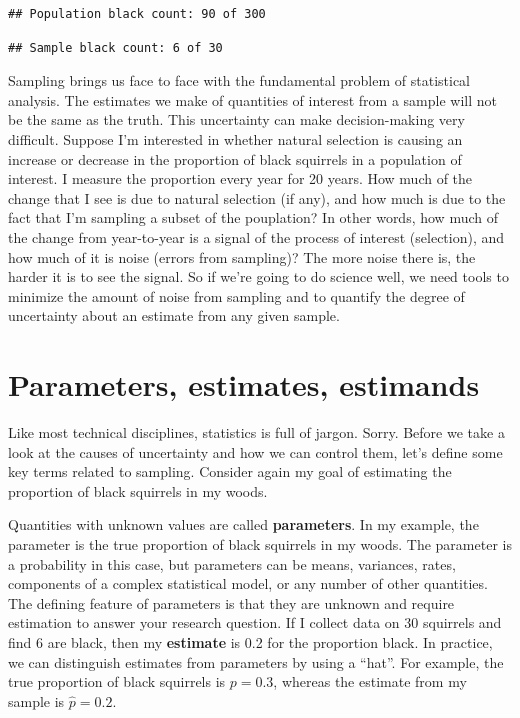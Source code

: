 \documentclass[
]{book}
\begin{document}
\begin{verbatim}
## Population black count: 90 of 300
\end{verbatim}

\begin{verbatim}
## Sample black count: 6 of 30
\end{verbatim}

Sampling brings us face to face with the fundamental problem of statistical analysis. The estimates we make of quantities of interest from a sample will not be the same as the truth. This uncertainty can make decision-making very difficult. Suppose I'm interested in whether natural selection is causing an increase or decrease in the proportion of black squirrels in a population of interest. I measure the proportion every year for 20 years. How much of the change that I see is due to natural selection (if any), and how much is due to the fact that I'm sampling a subset of the pouplation? In other words, how much of the change from year-to-year is a signal of the process of interest (selection), and how much of it is noise (errors from sampling)? The more noise there is, the harder it is to see the signal. So if we're going to do science well, we need tools to minimize the amount of noise from sampling and to quantify the degree of uncertainty about an estimate from any given sample.

\section{Parameters, estimates, estimands}\label{parameters-estimates-estimands}

Like most technical disciplines, statistics is full of jargon. Sorry. Before we take a look at the causes of uncertainty and how we can control them, let's define some key terms related to sampling. Consider again my goal of estimating the proportion of black squirrels in my woods.

Quantities with unknown values are called \textbf{parameters}. In my example, the parameter is the true proportion of black squirrels in my woods. The parameter is a probability in this case, but parameters can be means, variances, rates, components of a complex statistical model, or any number of other quantities. The defining feature of parameters is that they are unknown and require estimation to answer your research question. If I collect data on 30 squirrels and find 6 are black, then my \textbf{estimate} is 0.2 for the proportion black. In practice, we can distinguish estimates from parameters by using a ``hat''. For example, the true proportion of black squirrels is \(p = 0.3\), whereas the estimate from my sample is \(\hat{p}=0.2\).
\end{document}
